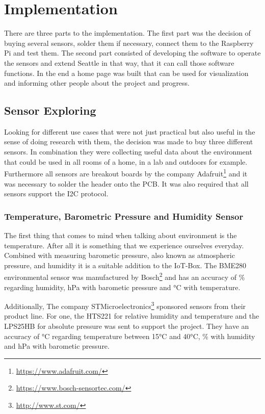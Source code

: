 \documentclass[bachelorthesis, grey, english]{mas-thesis-chapters} %
\begin{document}
\section{Implementation} \label{implementation}

There are three parts to the implementation. The first part was the decision of buying several sensors, solder them if necessary, connect them to the Raspberry Pi and test them. The second part consisted of developing the software to operate the sensors and extend Seattle in that way, that it can call those software functions. In the end a home page was built that can be used for visualization and informing other people about the project and progress.

\subsection{Sensor Exploring} \label{sensorDesc}

Looking for different use cases that were not just practical but also useful in the sense of doing research with them, the decision was made to buy three different sensors. In combination they were collecting useful data about the environment that could be used in all rooms of a home, in a lab and outdoors for example. Furthermore all sensors are breakout boards by the company Adafruit\footnote{\url{https://www.adafruit.com/}} and it was necessary to solder the header onto the \gls{PCB}. It was also required that all sensors support the \gls{I2C} protocol.

\subsubsection{Temperature, Barometric Pressure and Humidity Sensor} 

The first thing that comes to mind when talking about environment is the temperature. After all it is something that we experience ourselves everyday. Combined with measuring barometic pressure, also known as atmospheric pressure, and humidity it is a suitable addition to the \gls{IoT}-Box. The BME280 environmental sensor was manufactured by Bosch\footnote{\url{https://www.bosch-sensortec.com/}} and has an accuracy of \% regarding humidity,  \gls{hPa} with barometic pressure and °\gls{C} with temperature. \cite{bme280}

Additionally, The company STMicroelectronics\footnote{\url{http://www.st.com/}} sponsored sensors from their product line. For one, the HTS221 for relative humidity and temperature and the LPS25HB for absolute pressure was sent to support the project. They have an accuracy of °\gls{C} regarding temperature between 15°\gls{C} and 40°\gls{C}, \% with humidity and  hPa  with barometic pressure. \cite{stHum} \cite{stPress}
\end{document}
